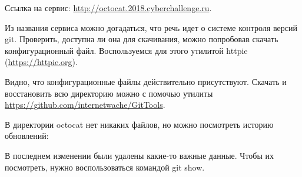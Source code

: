 
Ссылка на сервис: \url{http://octocat.2018.cyberchallenge.ru}.

\solutionSection

Из названия сервиса можно догадаться, что речь идет о системе контроля версий git. Проверить, доступна ли она для скачивания, можно попробовав скачать конфигурационный файл. Воспользуемся для этого утилитой httpie (\url{https://httpie.org}).


Видно, что конфигурационные файлы действительно присутствуют. Скачать и восстановить всю директорию можно с помочью утилиты \url{https://github.com/inter}\url{netwache/GitTools}.


В директории octocat нет никаких файлов, но можно посмотреть историю обновлений:


В последнем изменении были удалены какие-то важные данные. Чтобы их посмотреть, нужно воспользоваться командой git show.


